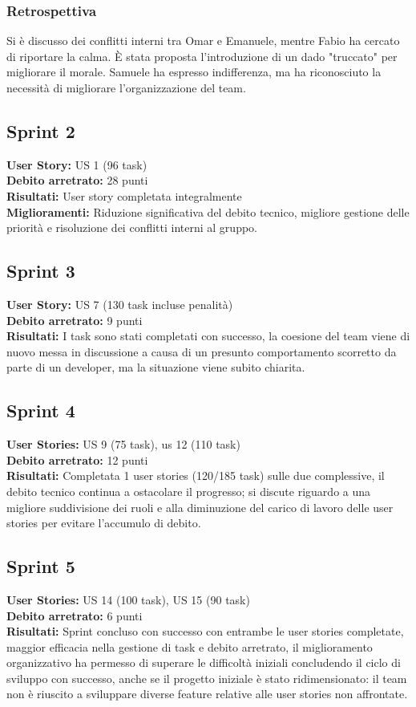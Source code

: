 \documentclass{article}
\begin{document}
\subsubsection*{Retrospettiva}  
Si è discusso dei conflitti interni tra Omar e Emanuele, mentre Fabio ha cercato 
di riportare la calma. È stata proposta l'introduzione di un dado "truccato" per 
migliorare il morale. Samuele ha espresso indifferenza, ma ha riconosciuto la 
necessità di migliorare l’organizzazione del team.


\subsection*{Sprint 2}
\textbf{User Story:} US 1 (96 task)\\
\textbf{Debito arretrato:} 28 punti\\
\textbf{Risultati:} User story completata integralmente\\
\textbf{Miglioramenti:} Riduzione significativa del debito tecnico, migliore 
gestione delle priorità e risoluzione dei conflitti interni al gruppo.

\subsection*{Sprint 3}
\textbf{User Story:} US 7 (130 task incluse penalità)\\
\textbf{Debito arretrato:} 9 punti\\
\textbf{Risultati:} I task sono stati completati con successo, la coesione del 
team viene di nuovo messa in discussione a causa di un presunto comportamento 
scorretto da parte di un developer, ma la situazione viene subito chiarita.

\subsection*{Sprint 4}
\textbf{User Stories:} US 9 (75 task), us 12 (110 task)\\
\textbf{Debito arretrato:} 12 punti\\
\textbf{Risultati:} Completata 1 user stories (120/185 task) sulle due 
complessive, il debito tecnico continua a ostacolare il progresso; si discute 
riguardo a una migliore suddivisione dei ruoli e alla diminuzione del carico di 
lavoro delle user stories per evitare l'accumulo di debito.

\subsection*{Sprint 5}
\textbf{User Stories:} US 14 (100 task), US 15 (90 task)\\
\textbf{Debito arretrato:} 6 punti\\
\textbf{Risultati:} Sprint concluso con successo con entrambe le user stories 
completate, maggior efficacia nella gestione di task e debito arretrato, il 
miglioramento organizzativo ha permesso di superare le difficoltà iniziali 
concludendo il ciclo di sviluppo con successo, anche se il progetto iniziale è 
stato ridimensionato: il team non è riuscito a sviluppare diverse feature 
relative alle user stories non affrontate.
\end{document}
